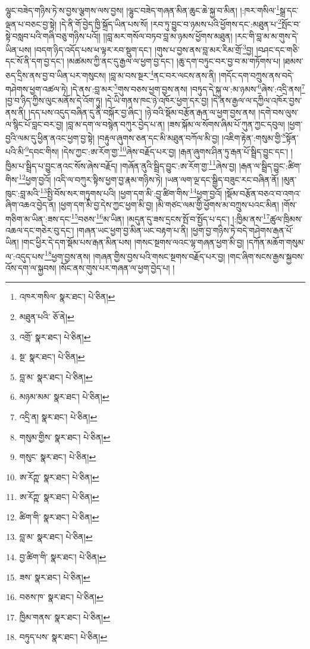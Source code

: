 ལྷུང་བཟེད་གཉིས་ཏེ་ས་བྱས་ལྕགས་ལས་བྱས། །ལྷུང་བཟེད་གཞན་མིན་ཆུང་ཆེ་སྐྱ་བ་མིན། །:ཁར་གསིལ་\footnote{འཁར་གསིལ་  སྣར་ཐང་།  པེ་ཅིན། }སྒྲ་དང་ལྡན་པ་བཅང་བྱ་སྟེ། །དེ་ནི་གོ་བྱེད་ཁྱི་སྐྲོད་ཡིན་པས་སོ། །རབ་ཏུ་བྱུང་བ་ཉམས་པའི་ཕྱོགས་དང་:མཐུན་པ་\footnote{མཐུན་པའི་  ཅོ་ནེ། }སྤོང་བ་སྟེ་བསླབ་པའི་གཞི་བཅུ་གཉིས་པའོ།། །།བླ་མར་གསོལ་བཏབ་བླ་མ་ཉམས་ཕྱོགས་མཐུན། །རང་གི་བླ་མ་མ་གུས་དེ་ཡིན་པས། །བདག་ཉིད་འདོད་པས་ཕ་ལྟར་རབ་སྡུག་དང་། །གུས་པ་བྱས་ནས་བླ་མར་རིམ་གྲོ་\footnote{འགྲོ་  སྣར་ཐང་།  པེ་ཅིན། }བྱ། །བཤང་དང་གཅི་དང་སོ་ནི་དག་བྱ་དང་། །མཚམས་ཀྱི་ནང་དུ་རྒྱལ་ལ་ཕྱག་བྱ་དང་། །ཆུ་དག་བཏུང་བར་བྱ་བ་མ་གཏོགས་པ། །ཐམས་ཅད་དྲིས་ནས་བྱ་བ་ཡིན་པར་གསུངས། །བླ་མ་བས་སྔར་\footnote{སྔ་  སྣར་ཐང་།  པེ་ཅིན། }ནང་བར་ལངས་ནས་ནི། །གདོང་དག་བཀྲུས་ནས་བདེ་གཤེགས་ཕྱག་འཚལ་ཏེ། །དེ་ནས་:བླ་མར་\footnote{བླ་མ་  སྣར་ཐང་།  པེ་ཅིན། }གུས་བཅས་ཕྱག་བྱས་ནས། །བཏུད་དེ་སྐུ་ལ་:མ་ཉམས་\footnote{མཉམ་མམ་  སྣར་ཐང་།  པེ་ཅིན། }ཞེས་:འདྲི་ནས།\footnote{འདྲི་ན།  སྣར་ཐང་།  པེ་ཅིན། } །བྱ་བ་ཉིད་ཀྱིས་ལུང་མནོས་དེ་འོག་ཏུ། །དེ་ཡི་གནས་ཁང་ཉེ་འཁོར་ཕྱག་དར་བྱ། །དེ་ནས་རྒྱལ་ལ་དཀྱིལ་འཁོར་བྱས་ནས་ནི། །དད་པས་འདུད་བཞིན་དུ་ནི་བསྐོར་བྱ་ཞིང་། །ཉེ་བའི་སྡོམ་བརྩོན་རྒན་ལ་ཕྱག་བྱས་ནས། །དགེ་བས་ལུས་ལ་སྙིང་པོ་བླང་བར་བྱ། །བླ་མ་དག་ལ་བསྙེན་བཀུར་བྱེད་པ་ན། །ཟས་སྐོམ་ལ་སོགས་ཞིམ་པོ་ཀུན་ཀྱང་དབུལ། །ཕྱག་བྱའི་ལམ་དུ་ཕྱིན་ནའང་ཕྱག་བྱ་སྟེ། །བརྟུལ་ཞུགས་ཅན་དང་མི་མཐུན་བཀོལ་མི་བྱ། །འཇིག་རྟེན་:གསུམ་གྱི་\footnote{གསུམ་གྱིས་  སྣར་ཐང་།  པེ་ཅིན། }སྟོན་པའི་མི་\footnote{གསུང་  སྣར་ཐང་།  པེ་ཅིན། }དབང་གིས། །དེས་ཀྱང་:ཨ་རོག་གྱ་\footnote{ཨ་རོཀྵ་  སྣར་ཐང་།  པེ་ཅིན། }ཞེས་བརྗོད་པར་བྱ། །རྒན་ཞུགས་ཤིན་ཏུ་རྒན་པོ་སྦྲིད་བྱུང་དང་། །ཁྱིམ་པ་སྦྲིད་པ་བྱུང་ནའང་སོས་ཞེས་བརྗོད། །གཞོན་ནུའི་སྦྲིད་བྱུང་:ཨ་རོག་གྱ་\footnote{ཨ་རོཀྵ་  སྣར་ཐང་།  པེ་ཅིན། }ཞེས་བྱ། །རྒན་ལ་སྦྲིད་བྱུང་:ཚིག་གིས་\footnote{ཚིག་གི་  སྣར་ཐང་།  པེ་ཅིན། }ཕྱག་བྱའོ། །འདི་ལ་བཀུར་སྟིས་ཕྱག་བྱ་རྣམ་གཉིས་ཏེ། །ཡན་ལག་ལྔ་དང་སྒྱིད་བཟུང་རང་བཞིན་ནོ། །མུན་ཁུང་:བླ་མའི་\footnote{བླ་མ་  སྣར་ཐང་།  པེ་ཅིན། }སྤྱི་བོས་སར་གཏུགས་པའི། །ཕྱག་དག་མི་:བྱ་ཚིག་གིས་\footnote{བྱ་ཚིག་གི་  སྣར་ཐང་།  པེ་ཅིན། }ཕྱག་བྱའོ། །སྡོམ་བརྩོན་བཅའ་བ་འགའ་ཞིག་འཆའ་བྱེད་ན། །ཕྱག་དག་མི་བྱ་དེས་ཀྱང་ཕྱག་མི་བྱ། །མི་གཙང་ལམ་གྱི་ཕྱོགས་མ་བཀྲུས་པའང་མིན། །གོས་གཅིག་མ་ཡིན་:ཟས་དང་\footnote{ཟས་  སྣར་ཐང་།  པེ་ཅིན། }བཅས་\footnote{བཅས་ཁ་  སྣར་ཐང་།  པེ་ཅིན། }མ་ཡིན། །མདུན་དུ་ཟས་དྲངས་སྤོ་བ་སྤྱོད་པ་དང་། །:ཁྱིམ་ནས་\footnote{ཁྱིམ་གནས་  སྣར་ཐང་།  པེ་ཅིན། }ཚུལ་ཁྲིམས་འཆལ་དང་གཅེར་བུ་དང་། །གཞན་ཡང་ཕྱག་བྱ་མིན་ཡང་བརྟག་པ་ནི། །ཕྱག་བྱ་གཉིས་ཏེ་བདེ་གཤེགས་རྒན་པོ་ཡིན། །གང་ཕྱིར་དེ་དག་སྡོམ་པས་རྒན་མིན་པས། །གསང་སྔགས་ལའང་ལྷ་གཞན་ཕྱག་མི་བྱ། །དཀོན་མཆོག་གསུམ་ལ་:འདུད་པས་\footnote{བཏུད་པས་  སྣར་ཐང་།  པེ་ཅིན། }ཕྱག་བྱས་ནས། །གཞན་གྱིས་བྱས་པའི་གསང་སྔགས་བརྗོད་པར་བྱ། །གང་ཞིག་སངས་རྒྱས་སྐྱབས་འོས་དག་ལ་སྐྱབས། །སོང་ནས་གུས་པར་གཞན་ལ་ཕྱག་བྱེད་པ། །
